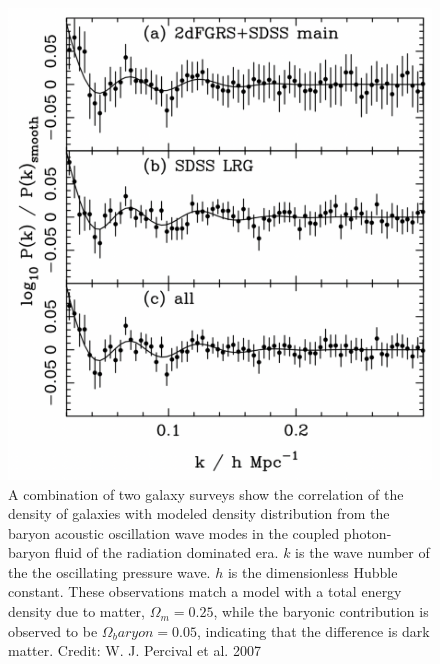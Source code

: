 \documentclass{paper}
\begin{document}
  \begin{figure}[!htb]
    \begin{centering}
    \includegraphics[scale=0.4]{DM-BAO.pdf}
    \caption{A combination of two galaxy surveys show the correlation of
      the density of galaxies with modeled density distribution from the
      baryon acoustic oscillation wave modes in the coupled photon-baryon
      fluid of the radiation dominated era. \(k\) is the wave number of the
      the oscillating pressure wave. \(h\) is the dimensionless Hubble
      constant. These observations match a model with a total energy density
      due to matter, \(\Omega_m = 0.25\), while the baryonic contribution is
      observed to be \(\Omega_baryon = 0.05\), indicating that the difference
      is dark matter.
    Credit: W. J. Percival et al. 2007}
    \label{fig:DM-BAO}
    \end{centering}
  \end{figure}
\end{document}
